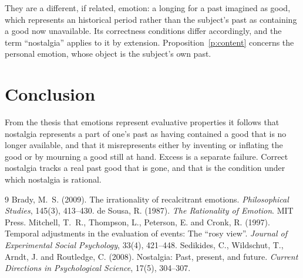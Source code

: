 \documentclass{situationist-preprint}
\begin{document}
\begin{reply}
They are a different, if related, emotion: a longing for a past imagined as good, which represents an historical period rather than the subject's past as containing a good now unavailable. Its correctness conditions differ accordingly, and the term \enquote{nostalgia} applies to it by extension. Proposition~\ref{p:content} concerns the personal emotion, whose object is the subject's own past.
\end{reply}

\section{Conclusion}

From the thesis that emotions represent evaluative properties it follows that nostalgia represents a part of one's past as having contained a good that is no longer available, and that it misrepresents either by inventing or inflating the good or by mourning a good still at hand. Excess is a separate failure. Correct nostalgia tracks a real past good that is gone, and that is the condition under which nostalgia is rational.

\begin{thebibliography}{9}\small
{} Brady, M.~S. (2009). The irrationality of recalcitrant emotions. \emph{Philosophical Studies}, 145(3), 413--430.
 de Sousa, R. (1987). \emph{The Rationality of Emotion}. MIT Press.
 Mitchell, T.~R., Thompson, L., Peterson, E. and Cronk, R. (1997). Temporal adjustments in the evaluation of events: The \enquote{rosy view}. \emph{Journal of Experimental Social Psychology}, 33(4), 421--448.
 Sedikides, C., Wildschut, T., Arndt, J. and Routledge, C. (2008). Nostalgia: Past, present, and future. \emph{Current Directions in Psychological Science}, 17(5), 304--307.
\end{thebibliography}
\end{document}
